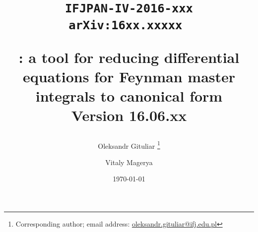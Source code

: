 \title{
  \begin{flushright}
  \tt\normalsize{IFJPAN-IV-2016-xxx}\\ 
  \tt\normalsize{arXiv:16xx.xxxxx} 
  \end{flushright}
  \vspace{1cm}
  \Large \bf \fuchsia: a tool for reducing differential equations for Feynman master integrals to canonical form\\
  \vspace{0.5cm}
  \normalsize \bf Version 16.06.xx
}

\author[a]{Oleksandr Gituliar%
    \thanks{Corresponding author; email address:
        \href{mailto:oleksandr.gituliar@ifj.edu.pl}
            {oleksandr.gituliar@ifj.edu.pl}}}

\author[ ]{Vitaly Magerya}


\date{\today\\\vspace{0.5cm}{\bf \LARGE A DRAFT}}
